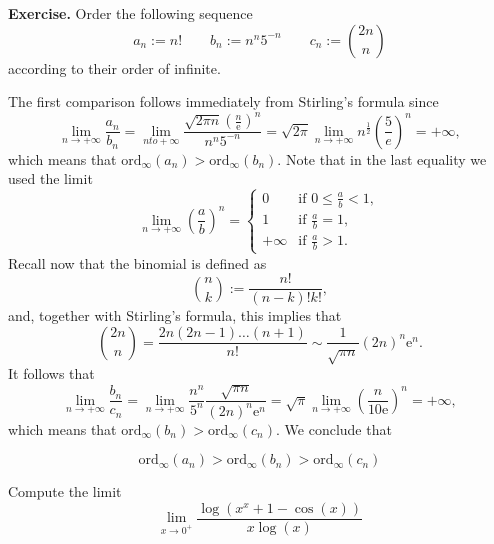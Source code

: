 \documentclass[a4paper,10 pt]{report}
\newcommand{\finalanswer}[1]{%
    \begin{finalAnswer}
    \[
        #1
    \]
    \end{finalAnswer}
}
\theoremstyle{definition}
\begin{document}
\begin{exerciseBox}
\textbf{Exercise.} Order the following sequence
\[
a_n := n! \qquad b_n := n^n 5^{-n} \qquad c_n := \binom{2n}{n}
\]
according to their order of infinite.\end{exerciseBox}

\begin{solutionBox}
The first comparison follows immediately from Stirling's formula since
\begin{equation*} \lim_{n \to + \infty} \frac{a_n}{b_n} =\lim_{n to + \infty} \frac{\sqrt{2 \pi n} \left( \frac{n}{\mathrm{e}} \right)^n}{n^n 5^{-n}} = \sqrt{2 \pi} \lim_{n \to + \infty} n^{\frac{1}{2}} \left( \frac{5}{e} \right)^n = + \infty, \end{equation*}
which means that $\mathrm{ord}_\infty(a_n) > \mathrm{ord}_\infty(b_n)$. Note that in the last equality we used the limit
\begin{equation*} \lim_{n \to + \infty}  \left( \frac{a}{b} \right)^n = \begin{cases} 0 & \text{if $0 \leq \frac{a}{b} < 1$}, \\[0.5em] 1 & \text{if $\frac{a}{b} = 1$}, \\[0.5em] + \infty & \text{if $\frac{a}{b} > 1$}. \end{cases} \end{equation*}
Recall now that the binomial is defined as
\begin{equation*} \binom{n}{k} := \frac{n!}{(n - k)! k!},\end{equation*}
and, together with Stirling's formula, this implies that
\begin{equation*} \binom{2n}{n} = \frac{2n(2n - 1) \dots (n + 1)}{n!} \sim \frac{1}{\sqrt{\pi n}} (2n)^{n} \mathrm{e}^n.\end{equation*}
It follows that
\begin{equation*} \lim_{n \to + \infty} \frac{b_n}{c_n} =\lim_{n \to + \infty} \frac{n^n}{5^n} \frac{\sqrt{\pi n}}{(2n)^{n} \mathrm{e}^n} = \sqrt{\pi} \lim_{n\to + \infty} \left( \frac{n}{10 \mathrm{e}}\right)^n = + \infty,\end{equation*}
which means that $\mathrm{ord}_\infty(b_n) > \mathrm{ord}_\infty(c_n)$. We conclude that
\finalanswer{\mathrm{ord}_\infty(a_n) > \mathrm{ord}_\infty(b_n) > \mathrm{ord}_\infty(c_n)}
\end{solutionBox}


\begin{exerciseBox}Compute the limit
\[
\lim_{x \to 0^+} \frac{\log(x^x + 1 - \cos(x))}{x \log(x)}
\]
\end{exerciseBox}
\end{document}
